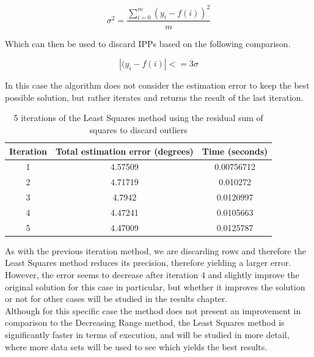 \begin{equation} \label{eq:residual}
\sigma^{2} = \frac{\sum_{i = 0}^{m}(y_{i}-f(i))^{2}}{m}
\end{equation}

Which can then be used to discard IPPs based on the following comparison.

\begin{equation} \label{eq:discard}
|(y_{i}-f(i)| <= 3\sigma
\end{equation}

In this case the algorithm does not consider the estimation error to keep the best possible solution, but rather iterates and returns the result of the last iteration.

\begin{table}[h!]
	\centering
	\def\arraystretch{1.2}
	\begin{tabular}{|c c c|} 
		\hline
		Iteration & Total estimation error (degrees) & Time (seconds) \\ [0.5ex] 
		\hline\hline
		1  & 4.57509 & 0.00756712 \\
		\hline
		2  & 4.71719 & 0.010272 \\
		\hline
		3  & 4.7942 & 0.0120997 \\
		\hline
		4  & 4.47241 & 0.0105663 \\
		\hline
		5  & 4.47009 & 0.0125787 \\
		\hline
	\end{tabular}
	\caption{5 iterations of the Least Squares method using the residual sum of squares to discard outliers}
\end{table}

As with the previous iteration method, we are discarding rows and therefore the Least Squares method reduces its precision, therefore yielding a larger error. However, the error seems to decrease after iteration 4 and slightly improve the original solution for this case in particular, but whether it improves the solution or not for other cases will be studied in the results chapter. \\

Although for this specific case the method does not present an improvement in comparison to the Decreasing Range method, the Least Squares method is significantly faster in terms of execution, and will be studied in more detail, where more data sets will be used to see which yields the best results.
